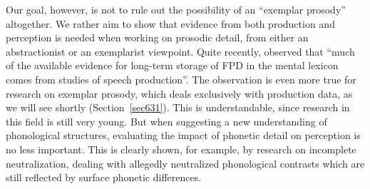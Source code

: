 Our goal, however, is not to rule out the possibility of an ``exemplar prosody'' altogether. We rather aim to show that evidence from both production and perception is needed when working on prosodic detail, from either an abstractionist or an exemplarist viewpoint. Quite recently, \citet{nguyen2009dynamical} observed that ``much of the available evidence for long-term storage of FPD in the mental lexicon comes from studies of speech production''. The observation is even more true for research on exemplar prosody, which deals exclusively with production data, as we will see shortly (Section~\ref{sec631}). This is understandable, since research in this field is still very young. But when suggesting a new understanding of phonological structures, evaluating the impact of phonetic detail on perception is no less important. This is clearly shown, for example, by research on incomplete neutralization, dealing with allegedly neutralized phonological contrasts which are still reflected by surface phonetic differences. 

